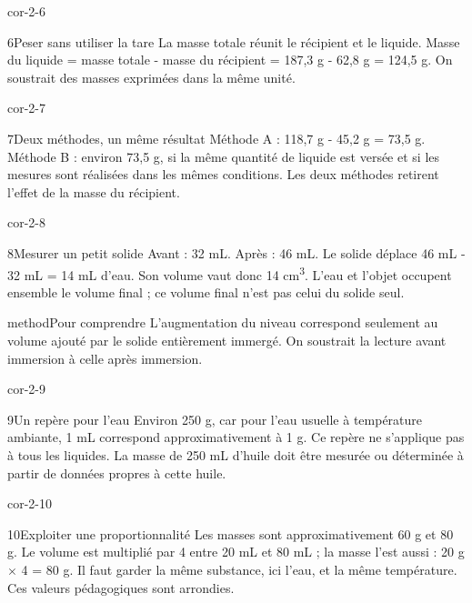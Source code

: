 \documentclass[12pt,twoside,openany]{book}
\begin{document}
\begin{blocLivre}{cor-2-6}
\begin{corrige}{6}{Peser sans utiliser la tare}
La masse totale réunit le récipient et le liquide. Masse du liquide = masse totale - masse du récipient = 187,3 g - 62,8 g = 124,5 g. On soustrait des masses exprimées dans la même unité.\par
\end{corrige}\end{blocLivre}
\begin{blocLivre}{cor-2-7}
\begin{corrige}{7}{Deux méthodes, un même résultat}
Méthode A : 118,7 g - 45,2 g = 73,5 g. Méthode B : environ 73,5 g, si la même quantité de liquide est versée et si les mesures sont réalisées dans les mêmes conditions. Les deux méthodes retirent l’effet de la masse du récipient.\par
\end{corrige}\end{blocLivre}
\begin{blocLivre}{cor-2-8}
\begin{corrige}{8}{Mesurer un petit solide}
Avant : 32 mL. Après : 46 mL. Le solide déplace 46 mL - 32 mL = 14 mL d’eau. Son volume vaut donc 14 cm\textsuperscript{3}. L’eau et l’objet occupent ensemble le volume final ; ce volume final n’est pas celui du solide seul.\par
\begin{pcEncadre}{method}{Pour comprendre}
L’augmentation du niveau correspond seulement au volume ajouté par le solide entièrement immergé. On soustrait la lecture avant immersion à celle après immersion.\par
\end{pcEncadre}
\end{corrige}\end{blocLivre}
\begin{blocLivre}{cor-2-9}
\begin{corrige}{9}{Un repère pour l’eau}
Environ 250 g, car pour l’eau usuelle à température ambiante, 1 mL correspond approximativement à 1 g. Ce repère ne s’applique pas à tous les liquides. La masse de 250 mL d’huile doit être mesurée ou déterminée à partir de données propres à cette huile.\par
\end{corrige}\end{blocLivre}
\begin{blocLivre}{cor-2-10}
\begin{corrige}{10}{Exploiter une proportionnalité}
Les masses sont approximativement 60 g et 80 g. Le volume est multiplié par 4 entre 20 mL et 80 mL ; la masse l’est aussi : 20 g \(\times\) 4 = 80 g. Il faut garder la même substance, ici l’eau, et la même température. Ces valeurs pédagogiques sont arrondies.\par
\end{corrige}\end{blocLivre}
\end{document}
